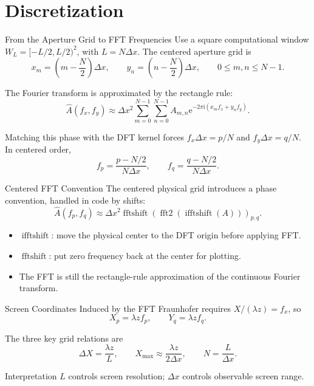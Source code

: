 \documentclass[aspectratio=169,11pt]{beamer}
\begin{document}
\section{Discretization}

\begin{frame}{From the Aperture Grid to FFT Frequencies}
    Use a square computational window \(W_L=[-L/2,L/2)^2\), with \(L=N\Delta x\). The centered aperture
    grid is
    \[
        x_m=\left(m-\frac{N}{2}\right)\Delta x,\qquad
        y_n=\left(n-\frac{N}{2}\right)\Delta x,
        \qquad 0\le m,n\le N-1.
    \]

    \vspace{0.15cm}
    The Fourier transform is approximated by the rectangle rule:
    \[
        \hat{A}(f_x,f_y)
        \approx
        \Delta x^2
        \sum_{m=0}^{N-1}\sum_{n=0}^{N-1}
        A_{m,n}
        \mathrm{e}^{-2\pi\mathrm{i}(x_mf_x+y_nf_y)}.
    \]

    \vspace{0.15cm}
    Matching this phase with the DFT kernel forces \(f_x\Delta x=p/N\) and
    \(f_y\Delta x=q/N\). In centered order,
    \[
        f_p=\frac{p-N/2}{N\Delta x},\qquad
        f_q=\frac{q-N/2}{N\Delta x}.
    \]
\end{frame}

\begin{frame}{Centered FFT Convention}
    The centered physical grid introduces a phase convention, handled in code by shifts:
    \[
    \hat{A}(f_p,f_q)
    \approx
    \Delta x^2
    \operatorname{fftshift}\!\left(
        \operatorname{fft2}\!\left(\operatorname{ifftshift}(A)\right)
    \right)_{p,q}.
    \]

    \vspace{0.2cm}
    \begin{itemize}
        \item \(\operatorname{ifftshift}\): move the physical center to the DFT origin before applying FFT.
        \item \(\operatorname{fftshift}\): put zero frequency back at the center for plotting.
        \item The FFT is still the rectangle-rule approximation of the continuous Fourier transform.
    \end{itemize}
\end{frame}

\begin{frame}{Screen Coordinates Induced by the FFT}
    Fraunhofer requires \(X/(\lambda z)=f_x\), so
    \[
        X_p=\lambda z f_p,\qquad Y_q=\lambda z f_q.
    \]

    \vspace{0.15cm}
    The three key grid relations are
    \[
        \Delta X=\frac{\lambda z}{L},\qquad
        X_{\max}\approx \frac{\lambda z}{2\Delta x},\qquad
        N=\frac{L}{\Delta x}.
    \]

    \vspace{0.2cm}
    \begin{block}{Interpretation}
        \(L\) controls screen resolution; \(\Delta x\) controls observable screen range.
    \end{block}
\end{frame}
\end{document}
